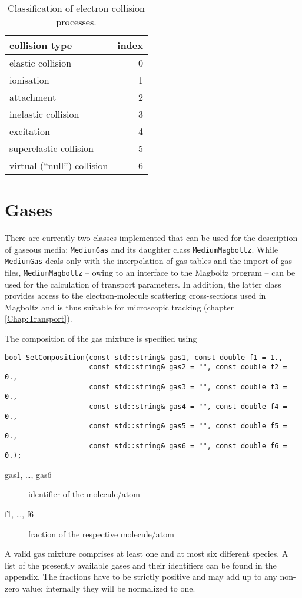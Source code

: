 \begin{table}
  \centering
  \begin{tabular}{l r}
    \toprule
    collision type         & index \\
    \midrule
    elastic collision      & 0  \\
    ionisation             & 1  \\
    attachment             & 2  \\
    inelastic collision    & 3  \\
    excitation             & 4  \\
    superelastic collision & 5  \\
    virtual (``null'') collision & 6 \\
    \bottomrule
  \end{tabular}
  \caption{Classification of electron collision processes.}
  \label{Tab:ElectronCollisionType}
\end{table}
\section{Gases}

There are currently two classes implemented that can be used for the 
description of gaseous media: \texttt{MediumGas} and its 
daughter class \texttt{MediumMagboltz}. 
While \texttt{MediumGas} deals only with the interpolation of gas tables 
and the import of gas files, 
\texttt{MediumMagboltz} -- owing to an interface to the 
Magboltz program \cite{Biagi1999} -- can be used for the calculation 
of transport parameters. 
In addition, the latter class provides access to the 
electron-molecule scattering cross-sections used in Magboltz and is 
thus suitable for microscopic tracking (chapter \ref{Chap:Transport}). 

The composition of the gas mixture is specified using
\begin{lstlisting}
bool SetComposition(const std::string& gas1, const double f1 = 1.,
                    const std::string& gas2 = "", const double f2 = 0.,
                    const std::string& gas3 = "", const double f3 = 0.,
                    const std::string& gas4 = "", const double f4 = 0.,
                    const std::string& gas5 = "", const double f5 = 0.,
                    const std::string& gas6 = "", const double f6 = 0.);
\end{lstlisting}
\begin{description}
  \item[gas1, \dots, gas6] identifier of the molecule/atom
  \item[f1, \dots, f6] fraction of the respective molecule/atom   
\end{description}
A valid gas mixture comprises at least one and at most six 
different species. 
A list of the presently available gases and their identifiers 
can be found in the appendix. 
The fractions have to be strictly positive and 
may add up to any non-zero value; 
internally they will be normalized to one.


